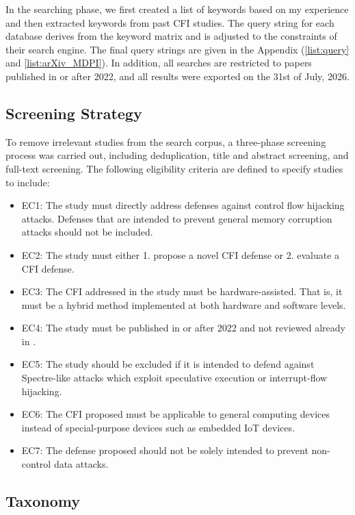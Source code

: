 \documentclass[journal,onecolumn]{IEEEtran}
\begin{document}
In the searching phase, we first created a list of keywords based on my experience and then extracted keywords from past CFI studies. The query string for each database derives from the keyword matrix and is adjusted to the constraints of their search engine. The final query strings are given in the Appendix (\ref{list:query} and \ref{list:arXiv_MDPI}). In addition, all searches are restricted to papers published in or after 2022, and all results were exported on the 31st of July, 2026.

\subsection{Screening Strategy}

To remove irrelevant studies from the search corpus, a three-phase screening process was carried out, including deduplication, title and abstract screening, and full-text screening. The following eligibility criteria are defined to specify studies to include: 

\begin{itemize} \label{list:criteria}
	\item EC1: The study must directly address defenses against control flow hijacking attacks. Defenses that are intended to prevent general memory corruption attacks should not be included.
	\item EC2: The study must either 1. propose a novel CFI defense or 2. evaluate a CFI defense.
	\item EC3: The CFI addressed in the study must be hardware-assisted. That is, it must be a hybrid method implemented at both hardware and software levels.
	\item EC4: The study must be published in or after 2022 and not reviewed already in \cite{Kumar22}.
	\item EC5: The study should be excluded if it is intended to defend against Spectre-like attacks which exploit speculative execution or interrupt-flow hijacking.
	\item EC6: The CFI proposed must be applicable to general computing devices instead of special-purpose devices such as embedded IoT devices.
	\item EC7: The defense proposed should not be solely intended to prevent non-control data attacks.
\end{itemize}

\subsection{Taxonomy}
\end{document}
